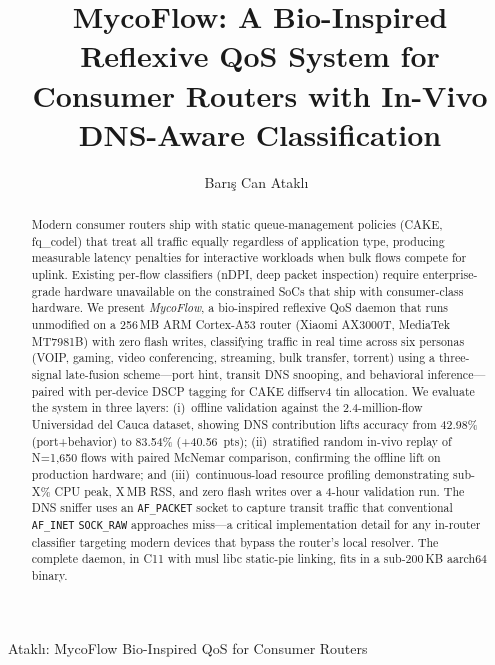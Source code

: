 \documentclass[journal,onecolumn]{IEEEtran}
\begin{document}
\title{MycoFlow: A Bio-Inspired Reflexive QoS System for Consumer Routers with In-Vivo DNS-Aware Classification}

\author{Bar\i{}\c{s} Can Atakl\i{}~
        \\
        }

%
{Atakl\i{}: MycoFlow Bio-Inspired QoS for Consumer Routers}

\maketitle

\begin{abstract}
Modern consumer routers ship with static queue-management policies (CAKE,
fq\_codel) that treat all traffic equally regardless of application type,
producing measurable latency penalties for interactive workloads when bulk
flows compete for uplink. Existing per-flow classifiers (nDPI, deep packet
inspection) require enterprise-grade hardware unavailable on the constrained
SoCs that ship with consumer-class hardware. We present \emph{MycoFlow}, a
bio-inspired reflexive QoS daemon that runs unmodified on a 256\,MB ARM
Cortex-A53 router (Xiaomi AX3000T, MediaTek MT7981B) with zero flash writes,
classifying traffic in real time across six personas (VOIP, gaming, video
conferencing, streaming, bulk transfer, torrent) using a three-signal late-fusion
scheme—port hint, transit DNS snooping, and behavioral inference—paired with
per-device DSCP tagging for CAKE diffserv4 tin allocation. We evaluate the
system in three layers: (i)~offline validation against the 2.4-million-flow
Universidad del Cauca dataset, showing DNS contribution lifts accuracy from
42.98\% (port+behavior) to 83.54\% (+40.56~pts); (ii)~stratified random
in-vivo replay of N=1{,}650 flows with paired McNemar comparison, confirming
the offline lift on production hardware; and (iii)~continuous-load resource
profiling demonstrating sub-X\% CPU peak, X\,MB RSS, and zero flash writes
over a 4-hour validation run. The DNS sniffer uses an \texttt{AF\_PACKET}
socket to capture transit traffic that conventional \texttt{AF\_INET}
\texttt{SOCK\_RAW} approaches miss—a critical implementation detail for any
in-router classifier targeting modern devices that bypass the router's
local resolver. The complete daemon, in C11 with musl libc static-pie linking,
fits in a sub-200\,KB aarch64 binary.

\end{abstract}
\end{document}
